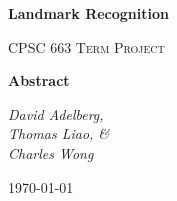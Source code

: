 \begin{titlepage}
	\centering
	{\vspace*{1cm}
	\huge\bfseries Landmark Recognition\par}
	\vspace{1cm}
	\par
	\vspace{1cm}
	{\scshape\Large CPSC 663 Term Project\par}
	\vspace{1cm}
	\large \textbf{Abstract}\par
	\vspace{1cm}
	{\Large\itshape David Adelberg,\\Thomas Liao, \&\\Charles Wong\par}
	\vfill
	{\large \today\par}
\end{titlepage}